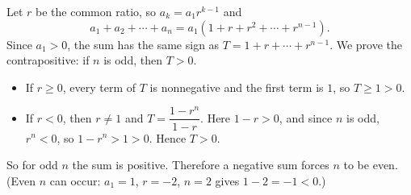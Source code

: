 Let $r$ be the common ratio, so $a_k=a_1r^{k-1}$ and
\[
a_1+a_2+\cdots+a_n=a_1\left(1+r+r^2+\cdots+r^{n-1}\right).
\]
Since $a_1>0$, the sum has the same sign as $T=1+r+\cdots+r^{n-1}$. We prove the contrapositive: if $n$ is odd, then $T>0$.
\begin{itemize}
\item If $r\ge0$, every term of $T$ is nonnegative and the first term is $1$, so $T\ge1>0$.
\item If $r<0$, then $r\ne1$ and $T=\dfrac{1-r^n}{1-r}$. Here $1-r>0$, and since $n$ is odd, $r^n<0$, so $1-r^n>1>0$. Hence $T>0$.
\end{itemize}
So for odd $n$ the sum is positive. Therefore a negative sum forces $n$ to be even. (Even $n$ can occur: $a_1=1$, $r=-2$, $n=2$ gives $1-2=-1<0$.)
